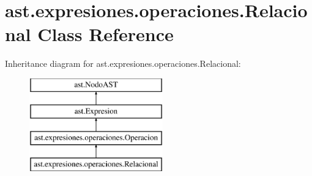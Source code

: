 \hypertarget{classast_1_1expresiones_1_1operaciones_1_1_relacional}{}\section{ast.\+expresiones.\+operaciones.\+Relacional Class Reference}
\label{classast_1_1expresiones_1_1operaciones_1_1_relacional}
Inheritance diagram for ast.\+expresiones.\+operaciones.\+Relacional\+:\begin{figure}[H]
\begin{center}
\leavevmode
\includegraphics[height=4.000000cm]{classast_1_1expresiones_1_1operaciones_1_1_relacional}
\end{center}
\end{figure}
